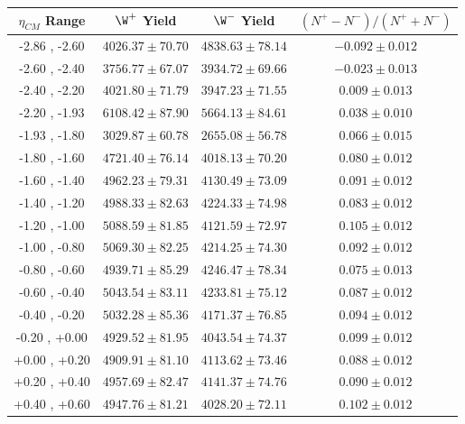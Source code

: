 \begin{table}[h!]
  \centering
  \renewcommand{\arraystretch}{1.5}
  \begin{tabular}{|c|*3c|}
    \hline
    $\eta_{CM}$ Range & $\W^{+} $ Yield & $\W^{-} $ Yield & $( N^{+} - N^{-} ) / ( N^{+} + N^{-} )$\\
    \hline\hline
    -2.86 , -2.60 & $4026.37 \pm 70.70$ & $4838.63 \pm 78.14$ & $-0.092 \pm 0.012$\\
    \hline
    -2.60 , -2.40 & $3756.77 \pm 67.07$ & $3934.72 \pm 69.66$ & $-0.023 \pm 0.013$\\
    \hline
    -2.40 , -2.20 & $4021.80 \pm 71.79$ & $3947.23 \pm 71.55$ & $0.009 \pm 0.013$\\
    \hline
    -2.20 , -1.93 & $6108.42 \pm 87.90$ & $5664.13 \pm 84.61$ & $0.038 \pm 0.010$\\
    \hline
    -1.93 , -1.80 & $3029.87 \pm 60.78$ & $2655.08 \pm 56.78$ & $0.066 \pm 0.015$\\
    \hline
    -1.80 , -1.60 & $4721.40 \pm 76.14$ & $4018.13 \pm 70.20$ & $0.080 \pm 0.012$\\
    \hline
    -1.60 , -1.40 & $4962.23 \pm 79.31$ & $4130.49 \pm 73.09$ & $0.091 \pm 0.012$\\
    \hline
    -1.40 , -1.20 & $4988.33 \pm 82.63$ & $4224.33 \pm 74.98$ & $0.083 \pm 0.012$\\
    \hline
    -1.20 , -1.00 & $5088.59 \pm 81.85$ & $4121.59 \pm 72.97$ & $0.105 \pm 0.012$\\
    \hline
    -1.00 , -0.80 & $5069.30 \pm 82.25$ & $4214.25 \pm 74.30$ & $0.092 \pm 0.012$\\
    \hline
    -0.80 , -0.60 & $4939.71 \pm 85.29$ & $4246.47 \pm 78.34$ & $0.075 \pm 0.013$\\
    \hline
    -0.60 , -0.40 & $5043.54 \pm 83.11$ & $4233.81 \pm 75.12$ & $0.087 \pm 0.012$\\
    \hline
    -0.40 , -0.20 & $5032.28 \pm 85.36$ & $4171.37 \pm 76.85$ & $0.094 \pm 0.012$\\
    \hline
    -0.20 , +0.00 & $4929.52 \pm 81.95$ & $4043.54 \pm 74.37$ & $0.099 \pm 0.012$\\
    \hline
    +0.00 , +0.20 & $4909.91 \pm 81.10$ & $4113.62 \pm 73.46$ & $0.088 \pm 0.012$\\
    \hline
    +0.20 , +0.40 & $4957.69 \pm 82.47$ & $4141.37 \pm 74.76$ & $0.090 \pm 0.012$\\
    \hline
    +0.40 , +0.60 & $4947.76 \pm 81.21$ & $4028.20 \pm 72.11$ & $0.102 \pm 0.012$\\

\end{tabular}
\end{table}
